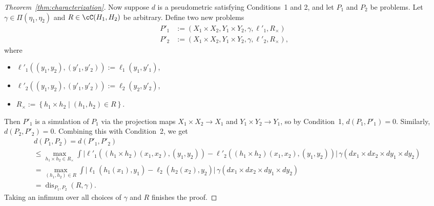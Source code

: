 \documentclass[twoside,11pt]{article}
\DeclareMathOperator{\dis}{dis}
\newcommand{\set}[2]{\left\{ #1\middle| #2\right\}}
\begin{document}
\begin{proof}[Theorem~\ref{thm:characterization}]
    Now suppose $d$ is a pseudometric satisfying Conditions~1 and 2, and let $P_1$ and $P_2$ be problems. Let $\gamma \in \Pi(\eta_1,\eta_2)$ and $R\in \cC(H_1,H_2)$ be arbitrary. Define two new problems
    \begin{align*}
        P'_1 & := (X_1\times X_2, Y_1\times Y_2, \gamma, \ell'_1, R_\times)\\
        P'_2 & := (X_1\times X_2, Y_1\times Y_2, \gamma, \ell'_2, R_\times),
    \end{align*}
    where
    \begin{itemize}
        \item $\ell'_1((y_1,y_2),(y'_1,y'_2)) := \ell_1(y_1,y'_1)$,
        \item $\ell'_2((y_1,y_2),(y'_1,y'_2)) := \ell_2(y_2,y'_2)$,
        \item $R_\times := \set{h_1\times h_2}{(h_1,h_2)\in R}$.
    \end{itemize}
    Then $P'_1$ is a simulation of $P_1$ via the projection maps $X_1\times X_2 \to X_1$ and $Y_1\times Y_2 \to Y_1$, so by Condition~1, $d(P_1,P'_1) = 0$. Similarly, $d(P_2,P'_2) = 0$. Combining this with Condition~2, we get
    \begin{align*}
        & d(P_1,P_2)
        =
        d(P'_1,P'_2)
        \\ & \leq
        \max_{h_1\times h_2 \in R_\times} \int \big|
            \ell'_1((h_1\times h_2)(x_1,x_2),(y_1,y_2))
            -
            \ell'_2((h_1\times h_2)(x_1,x_2),(y_1,y_2))
        \big|\, \gamma(dx_1{\times} dx_2 {\times} dy_1 {\times} dy_2)
        \\ & =
        \max_{(h_1, h_2) \in R} \int \big|
            \ell_1(h_1(x_1),y_1)
            -
            \ell_2(h_2(x_2),y_2)
        \big|\, \gamma(dx_1{\times} dx_2 {\times} dy_1 {\times} dy_2)
        \\ & =
        \dis_{P_1,P_2}(R,\gamma).
    \end{align*}
    Taking an infimum over all choices of $\gamma$ and $R$ finishes the proof.
\end{proof}
\end{document}
